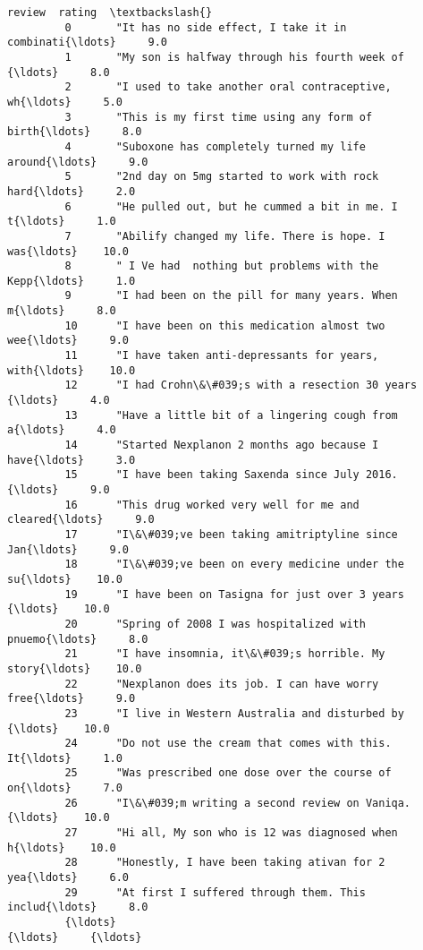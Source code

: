 \documentclass[11pt]{article}
\begin{document}
\begin{Verbatim}[commandchars=\\\{\}]
                                                            review  rating  \textbackslash{}
         0       "It has no side effect, I take it in combinati{\ldots}     9.0   
         1       "My son is halfway through his fourth week of {\ldots}     8.0   
         2       "I used to take another oral contraceptive, wh{\ldots}     5.0   
         3       "This is my first time using any form of birth{\ldots}     8.0   
         4       "Suboxone has completely turned my life around{\ldots}     9.0   
         5       "2nd day on 5mg started to work with rock hard{\ldots}     2.0   
         6       "He pulled out, but he cummed a bit in me. I t{\ldots}     1.0   
         7       "Abilify changed my life. There is hope. I was{\ldots}    10.0   
         8       " I Ve had  nothing but problems with the Kepp{\ldots}     1.0   
         9       "I had been on the pill for many years. When m{\ldots}     8.0   
         10      "I have been on this medication almost two wee{\ldots}     9.0   
         11      "I have taken anti-depressants for years, with{\ldots}    10.0   
         12      "I had Crohn\&\#039;s with a resection 30 years {\ldots}     4.0   
         13      "Have a little bit of a lingering cough from a{\ldots}     4.0   
         14      "Started Nexplanon 2 months ago because I have{\ldots}     3.0   
         15      "I have been taking Saxenda since July 2016.  {\ldots}     9.0   
         16      "This drug worked very well for me and cleared{\ldots}     9.0   
         17      "I\&\#039;ve been taking amitriptyline since Jan{\ldots}     9.0   
         18      "I\&\#039;ve been on every medicine under the su{\ldots}    10.0   
         19      "I have been on Tasigna for just over 3 years {\ldots}    10.0   
         20      "Spring of 2008 I was hospitalized with pnuemo{\ldots}     8.0   
         21      "I have insomnia, it\&\#039;s horrible. My story{\ldots}    10.0   
         22      "Nexplanon does its job. I can have worry free{\ldots}     9.0   
         23      "I live in Western Australia and disturbed by {\ldots}    10.0   
         24      "Do not use the cream that comes with this. It{\ldots}     1.0   
         25      "Was prescribed one dose over the course of on{\ldots}     7.0   
         26      "I\&\#039;m writing a second review on Vaniqa.  {\ldots}    10.0   
         27      "Hi all, My son who is 12 was diagnosed when h{\ldots}    10.0   
         28      "Honestly, I have been taking ativan for 2 yea{\ldots}     6.0   
         29      "At first I suffered through them. This includ{\ldots}     8.0   
         {\ldots}                                                   {\ldots}     {\ldots}   

\end{Verbatim}
\end{document}
